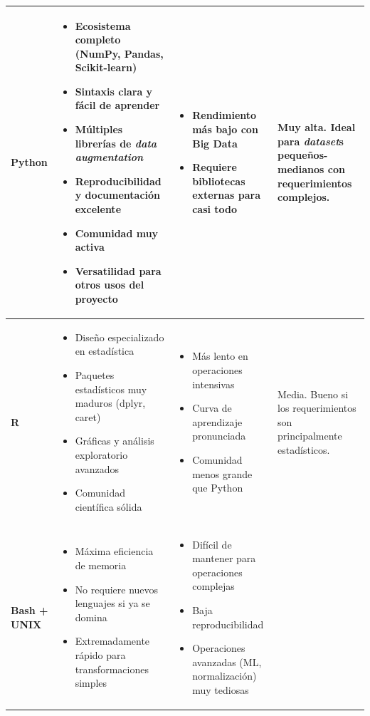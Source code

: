\begin{xltabular}{\textwidth}{@{} >{\centering\arraybackslash}p{0.13\textwidth} >{\raggedright\arraybackslash}X >{\raggedright\arraybackslash}X >{\raggedright\arraybackslash}X @{}}
\bottomrule
\endlastfoot%
	\textbf{Python} & 
	\begin{itemize}[nosep] \item Ecosistema completo (NumPy, Pandas, Scikit-learn) \item Sintaxis clara y fácil de aprender \item Múltiples librerías de \textit{data augmentation} \item Reproducibilidad y documentación excelente \item Comunidad muy activa \item Versatilidad para otros usos del proyecto \end{itemize} &
	\begin{itemize}[nosep] \item Rendimiento más bajo con Big Data \item Requiere bibliotecas externas para casi todo \end{itemize} &
	 Muy alta. Ideal para \textit{dataset}s pequeños-medianos con requerimientos complejos. \\
	\midrule
	\textbf{R} &
	\begin{itemize}[nosep] \item Diseño especializado en estadística \item Paquetes estadísticos muy maduros (dplyr, caret) \item Gráficas y análisis exploratorio avanzados \item Comunidad científica sólida \end{itemize} &
	\begin{itemize}[nosep] \item Más lento en operaciones intensivas \item Curva de aprendizaje pronunciada \item Comunidad menos grande que Python \end{itemize} &
	Media. Bueno si los requerimientos son principalmente estadísticos. \\
	\midrule
	\textbf{Bash + UNIX} &
	\begin{itemize}[nosep] \item Máxima eficiencia de memoria \item No requiere nuevos lenguajes si ya se domina \item Extremadamente rápido para transformaciones simples \end{itemize} &
	\begin{itemize}[nosep] \item Difícil de mantener para operaciones complejas \item Baja reproducibilidad \item Operaciones avanzadas (ML, normalización) muy tediosas \end{itemize} &

\end{xltabular}
